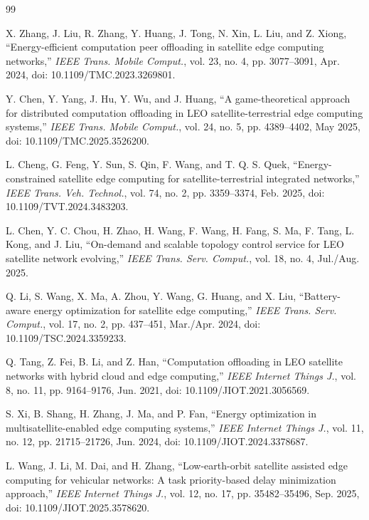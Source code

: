 \documentclass[a4paper,11pt]{article}
\begin{document}
\begin{thebibliography}{99}

X. Zhang, J. Liu, R. Zhang, Y. Huang, J. Tong, N. Xin,
L. Liu, and Z. Xiong,
``Energy-efficient computation peer offloading in satellite
edge computing networks,''
\textit{IEEE Trans. Mobile Comput.},
vol. 23, no. 4, pp. 3077--3091, Apr. 2024,
doi: 10.1109/TMC.2023.3269801.

Y. Chen, Y. Yang, J. Hu, Y. Wu, and J. Huang,
``A game-theoretical approach for distributed computation offloading
in LEO satellite-terrestrial edge computing systems,''
\textit{IEEE Trans. Mobile Comput.},
vol. 24, no. 5, pp. 4389--4402, May 2025,
doi: 10.1109/TMC.2025.3526200.

L. Cheng, G. Feng, Y. Sun, S. Qin, F. Wang, and T. Q. S. Quek,
``Energy-constrained satellite edge computing for
satellite-terrestrial integrated networks,''
\textit{IEEE Trans. Veh. Technol.},
vol. 74, no. 2, pp. 3359--3374, Feb. 2025,
doi: 10.1109/TVT.2024.3483203.

L. Chen, Y. C. Chou, H. Zhao, H. Wang, F. Wang, H. Fang, S. Ma, F. Tang,
L. Kong, and J. Liu,
``On-demand and scalable topology control service for
LEO satellite network evolving,''
\textit{IEEE Trans. Serv. Comput.}, vol. 18, no. 4, Jul./Aug. 2025.

Q. Li, S. Wang, X. Ma, A. Zhou, Y. Wang, G. Huang, and X. Liu,
``Battery-aware energy optimization for satellite edge computing,''
\textit{IEEE Trans. Serv. Comput.}, vol. 17, no. 2, pp. 437--451,
Mar./Apr. 2024, doi: 10.1109/TSC.2024.3359233.

Q. Tang, Z. Fei, B. Li, and Z. Han,
``Computation offloading in LEO satellite networks with
hybrid cloud and edge computing,''
\textit{IEEE Internet Things J.},
vol. 8, no. 11, pp. 9164--9176, Jun. 2021,
doi: 10.1109/JIOT.2021.3056569.

S. Xi, B. Shang, H. Zhang, J. Ma, and P. Fan,
``Energy optimization in multisatellite-enabled edge computing systems,''
\textit{IEEE Internet Things J.},
vol. 11, no. 12, pp. 21715--21726, Jun. 2024,
doi: 10.1109/JIOT.2024.3378687.

L. Wang, J. Li, M. Dai, and H. Zhang,
``Low-earth-orbit satellite assisted edge computing for vehicular networks:
A task priority-based delay minimization approach,''
\textit{IEEE Internet Things J.},
vol. 12, no. 17, pp. 35482--35496, Sep. 2025,
doi: 10.1109/JIOT.2025.3578620.


\end{thebibliography}
\end{document}
